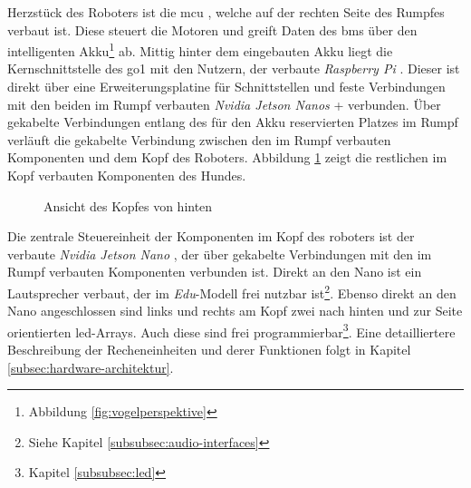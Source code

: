 Herzstück des Roboters ist die \gls{mcu} , welche auf der rechten Seite des Rumpfes verbaut ist.
Diese steuert die Motoren und greift Daten des \gls{bms}  über den intelligenten Akku\footnote{Abbildung \ref{fig:vogelperspektive} }
ab.
Mittig hinter dem eingebauten Akku liegt die Kernschnittstelle des \gls{go1} mit den Nutzern, der verbaute \emph{Raspberry Pi}
.
Dieser ist direkt über eine Erweiterungsplatine  für Schnittstellen und feste Verbindungen mit den beiden im Rumpf
verbauten \emph{Nvidia Jetson Nanos} + verbunden.
Über gekabelte Verbindungen entlang des für den Akku reservierten Platzes im Rumpf verläuft die gekabelte Verbindung 
zwischen den im Rumpf verbauten Komponenten und dem Kopf des Roboters.
Abbildung \ref{fig:kopf} zeigt die restlichen im Kopf verbauten Komponenten des Hundes.

\begin{figure}[h]
    \caption{Ansicht des Kopfes von hinten}\label{fig:kopf}
\end{figure}

Die zentrale Steuereinheit der Komponenten im Kopf des roboters ist der verbaute \emph{Nvidia Jetson Nano} , der
über gekabelte Verbindungen  mit den im Rumpf verbauten Komponenten verbunden ist.
Direkt an den Nano ist ein Lautsprecher  verbaut, der im \emph{Edu}-Modell frei nutzbar ist\footnote{Siehe Kapitel \ref{subsubsec:audio-interfaces}}.
Ebenso direkt an den Nano angeschlossen sind links und rechts am Kopf zwei nach hinten und zur Seite orientierten
\gls{led}-Arrays.
Auch diese sind frei programmierbar\footnote{Kapitel \ref{subsubsec:led}}.
Eine detailliertere Beschreibung der Recheneinheiten und derer Funktionen folgt in Kapitel \ref{subsec:hardware-architektur}.

